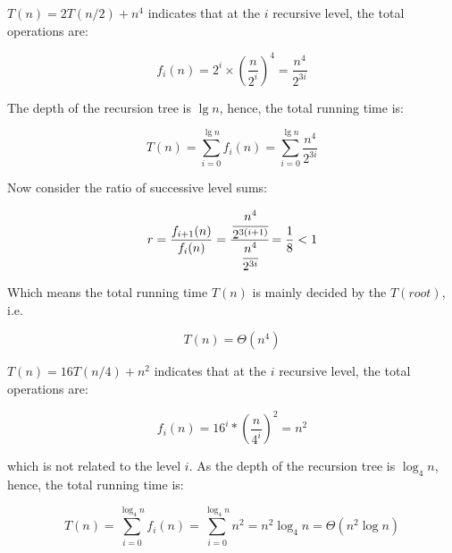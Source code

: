 \begin{homeworkProblem}

\begin{homeworkSubProblem}[$T(n)=2T(n/2)+n^4$]\label{sub6.1}
$T(n)=2T(n/2)+n^4$ indicates that at the $i$ recursive level, the total
operations are:

\begin{equation}
f_i(n) = 2^i\times\left(\frac{n}{2^i}\right)^4=\frac{n^4}{2^{3i}}
\end{equation}

The depth of the recursion tree is $\lg n$, hence, the total running time is:

\begin{equation}T(n) =\sum_{i=0}^{\lg n}f_i(n) = \sum_{i=0}^{\lg n}\frac{n^4}{2^{3i}}
\end{equation}

Now consider the ratio of successive level sums:

\begin{equation}
r = \frac{f_{i+1}(n)}{f_i(n)}
  = \cfrac{\cfrac{n^4}{2^{3(i+1)}}}{\cfrac{n^4}{2^{3i}}}
  = \frac{1}{8}
  < 1
\end{equation}

Which means the total running time $T(n)$ is mainly decided by the $T(root)$, i.e.

\begin{equation}
T(n) = \Theta(n^4)
\end{equation}

\end{homeworkSubProblem}

\begin{homeworkSubProblem}[$T(n)=16T(n/4)+n^2$]

$T(n)=16T(n/4)+n^2$ indicates that at the $i$ recursive level, the total
operations are:

\begin{equation}
f_i(n) = 16^i*\left(\frac{n}{4^i}\right)^2=n^2
\end{equation}

which is not related to the level $i$. As the depth of the recursion tree is $\log_4 n$, hence, the total running time is:

\begin{equation} \label{eq:6.2.1}
T(n)
=\sum_{i=0}^{\log_4 n}f_i(n)
= \sum_{i=0}^{\log_4 n}n^2
= n^2 \log_4 n
= \Theta(n^2\log n)
\end{equation}

\end{homeworkSubProblem}


\end{homeworkProblem}
